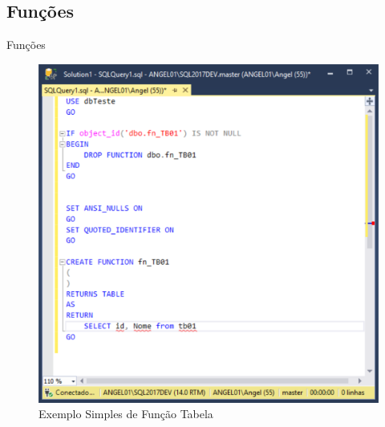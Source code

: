 	
	\subsection{Funções}

	\begin{frame}
	
	\begin{CaixaModelo01}{Funções}
		
		\begin{figure}
		\includegraphics[scale=.35]{./Figuras/Funcao01.png}
		\caption{Exemplo Simples de Função Tabela}
		\label{fig:Funcoes01}
		\end{figure}
	
	\end{CaixaModelo01}
	
	\end{frame}

